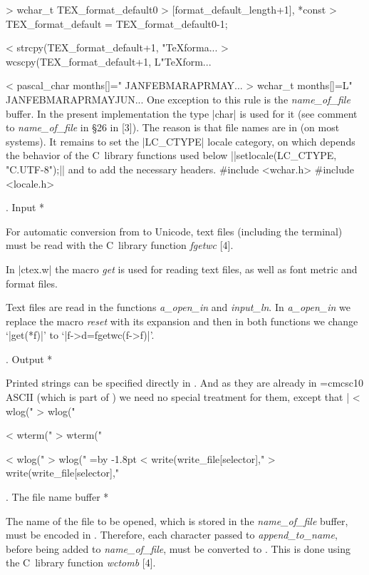 > wchar_t TEX_format_default0
>   [format_default_length+1], *const
> TEX_format_default = TEX_format_default0-1;

< strcpy(TEX_format_default+1, "TeXforma...
> wcscpy(TEX_format_default+1, L"TeXform...

< pascal_char months[]=" JANFEBMARAPRMAY...
> wchar_t months[]=L" JANFEBMARAPRMAYJUN...
\endverbatim
One exception to this rule is the {\it name\_of\_file\/}
buffer. In the present implementation the type |char|
is used for it (see comment to
{\it name\_of\_file\/} in \S26 in [3]). The reason is
that file names are in  (on most systems).
\medskip
It remains to set the |LC_CTYPE| locale category, on which
depends the behavior of the C~library functions used below
||setlocale(LC_CTYPE, "C.UTF-8");||
and to add the necessary headers.
\verbatim
#include <wchar.h>
#include <locale.h>
\endverbatim

. Input *

For automatic conversion from  to Unicode,
text files (including the terminal) must be
read with the C~library function \hbox{\it fgetwc\/} [4].

In |ctex.w| the macro {\it get\/}
is used for reading text files, as well as
font metric and format files.

Text files are read in the functions
{\it a\_open\_in\/} and
{\it input\_ln\/}.
In
{\it a\_open\_in\/} we replace the macro
{\it reset\/}
with its expansion and then in both functions
we change `|get(*f)|' to `|f->d=fgetwc(f->f)|'.

. Output *

Printed strings can be specified directly in .
And as they are already in {\font\rm=cmcsc10 \rm ASCII} (which is
part of )
we need no special treatment for them,
except that |%
\verbatim
< wlog("%c",months[k]);
> wlog("%lc",months[k]);

< wterm("%c",xchr[s]);
> wterm("%lc",xchr[s]);

< wlog("%c",xchr[s]);
> wlog("%lc",xchr[s]);
\endverbatim
\begingroup
\everyverbatim={\advance\parindent by -1.8pt }
\verbatim
< write(write_file[selector],"%c",xchr[s]);
> write(write_file[selector],"%lc",xchr[s]);
\endverbatim
\endgroup

. The file name buffer *

The name of the file to be opened, which is
stored in the {\it name\_of\_file\/} buffer,
must be encoded in \hbox{}.
Therefore, each character passed to {\it append\_to\_name\/},
before being added to {\it name\_of\_file\/},
must
be converted to \hbox{}. This is done using
the C~library function {\it wctomb\/} [4].

